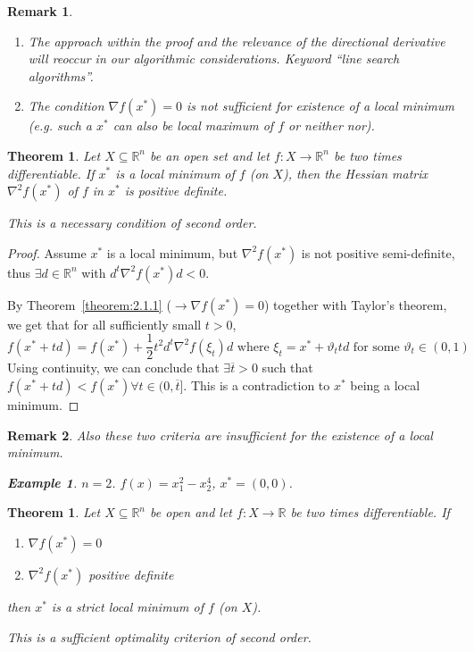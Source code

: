 \documentclass[a4paper]{article}
\newcounter{lecref}[subsection]
\numberwithin{lecref}{subsection}
\newtheorem{theorem}[lecref]{Theorem}
\newtheorem*{Example}{Example}
\newtheorem*{Remark}{Remark}
\begin{document}
\begin{Remark}
	\begin{enumerate}
		\item The approach within the proof and the relevance of the directional derivative will reoccur in our algorithmic considerations. Keyword \enquote{line search algorithms}.
		\item The condition $\nabla f(x^*) = 0$ is not sufficient for existence of a local minimum (e.g. such a $x^*$ can also be local maximum of $f$ or neither nor).
	\end{enumerate}
\end{Remark}

\begin{theorem}
	\label{theorem:2.1.2}
	Let $X \subseteq \mathbb R^n$ be an open set and let $f: X \to \mathbb R^n$ be two times differentiable.
	If $x^*$ is a local minimum of $f$ (on $X$), then the Hessian matrix $\nabla^2 f(x^*)$ of $f$ in $x^*$ is positive definite.

	This is a necessary condition of second order.
\end{theorem}

\begin{proof}
	Assume $x^*$ is a local minimum, but $\nabla^2 f(x^*)$ is not positive semi-definite, thus $\exists d \in \mathbb R^n$ with $d^t \nabla^2 f(x^*) d < 0$.

	By Theorem~\ref{theorem:2.1.1} ($\to \nabla f(x^*) = 0$) together with Taylor's theorem, we get that for all sufficiently small $t > 0$,
	\[ f(x^* + td) = f(x^*) + \frac12 t^2 d^t \nabla^2 f(\xi_t) d \text{ where } \xi_t = x^* + \vartheta _t td \text{ for some } \vartheta_t \in (0, 1) \]
	Using continuity, we can conclude that $\exists \overline{t} > 0$ such that $f(x^* + td) < f(x^*) \forall t \in (0, \overline{t}]$. This is a contradiction to $x^*$ being a local minimum.
\end{proof}

\begin{Remark}
	Also these two criteria are insufficient for the existence of a local minimum.
	\begin{Example}
		$n = 2$. $f(x) = x_1^2 - x_2^4$, $x^* = (0, 0)$.
	\end{Example}
\end{Remark}

\begin{theorem}
	\label{theorem:2.1.3}
	Let $X \subseteq \mathbb R^n$ be open and let $f: X \to \mathbb R$ be two times differentiable. If
	\begin{enumerate}
		\item $\nabla f(x^*) = 0$
		\item $\nabla^2 f(x^*)$ positive definite
	\end{enumerate}
	then $x^*$ is a strict local minimum of $f$ (on $X$).

	This is a sufficient optimality criterion of second order.
\end{theorem}
\end{document}
